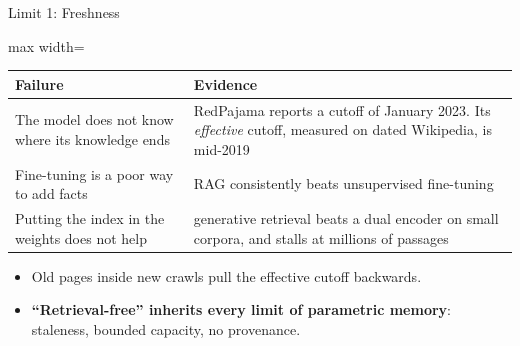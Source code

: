 \begin{frame}{Limit 1: Freshness}
    \begin{center}
    \small
    \renewcommand{\arraystretch}{1.2}
    \begin{adjustbox}{max width=\linewidth}\begin{tabular}{>{\raggedright\arraybackslash}p{4.4cm}>{\raggedright\arraybackslash}p{8.9cm}}
        \toprule
        \textbf{Failure} & \textbf{Evidence} \\
        \midrule
        The model does not know where its knowledge ends & RedPajama reports a cutoff of January 2023. Its \emph{effective} cutoff, measured on dated Wikipedia, is mid-2019 \\
        Fine-tuning is a poor way to add facts & RAG consistently beats unsupervised fine-tuning \\
        Putting the index in the weights does not help & generative retrieval beats a dual encoder on small corpora, and stalls at millions of passages \\
        \bottomrule
    \end{tabular}\end{adjustbox}
    \end{center}
    \begin{itemize}\itemsep0.35em
        \item Old pages inside new crawls pull the effective cutoff backwards.
        \item \textbf{``Retrieval-free'' inherits every limit of parametric memory}: staleness, bounded capacity, no provenance.
    \end{itemize}
\end{frame}

